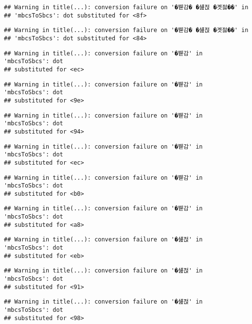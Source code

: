 \documentclass[
]{article}
\begin{document}
\begin{verbatim}
## Warning in title(...): conversion failure on '�붿감� �섎젅 �곗젏��' in
## 'mbcsToSbcs': dot substituted for <8f>
\end{verbatim}

\begin{verbatim}
## Warning in title(...): conversion failure on '�붿감� �섎젅 �곗젏��' in
## 'mbcsToSbcs': dot substituted for <84>
\end{verbatim}

\begin{verbatim}
## Warning in title(...): conversion failure on '�붿감' in 'mbcsToSbcs': dot
## substituted for <ec>
\end{verbatim}

\begin{verbatim}
## Warning in title(...): conversion failure on '�붿감' in 'mbcsToSbcs': dot
## substituted for <9e>
\end{verbatim}

\begin{verbatim}
## Warning in title(...): conversion failure on '�붿감' in 'mbcsToSbcs': dot
## substituted for <94>
\end{verbatim}

\begin{verbatim}
## Warning in title(...): conversion failure on '�붿감' in 'mbcsToSbcs': dot
## substituted for <ec>
\end{verbatim}

\begin{verbatim}
## Warning in title(...): conversion failure on '�붿감' in 'mbcsToSbcs': dot
## substituted for <b0>
\end{verbatim}

\begin{verbatim}
## Warning in title(...): conversion failure on '�붿감' in 'mbcsToSbcs': dot
## substituted for <a8>
\end{verbatim}

\begin{verbatim}
## Warning in title(...): conversion failure on '�섎젅' in 'mbcsToSbcs': dot
## substituted for <eb>
\end{verbatim}

\begin{verbatim}
## Warning in title(...): conversion failure on '�섎젅' in 'mbcsToSbcs': dot
## substituted for <91>
\end{verbatim}

\begin{verbatim}
## Warning in title(...): conversion failure on '�섎젅' in 'mbcsToSbcs': dot
## substituted for <98>
\end{verbatim}
\end{document}
